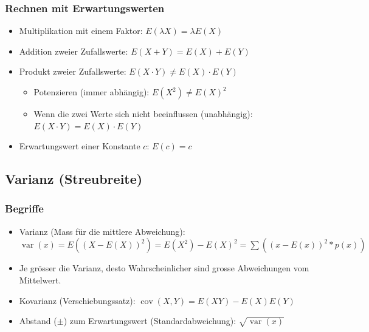 \subsubsection{Rechnen mit Erwartungswerten}
\begin{itemize}
  \item Multiplikation mit einem Faktor: $E(\lambda X) = \lambda E(X)$
  \item Addition zweier Zufallswerte: $E(X + Y) = E(X) + E(Y)$
  \item Produkt zweier Zufallswerte: $E(X \cdot Y) \ne E(X) \cdot E(Y)$
  \begin{itemize}
    \item Potenzieren (immer abhängig): $E(X^2) \ne E(X)^2$
    \item Wenn die zwei Werte sich nicht beeinflussen
      (unabhängig): $E(X \cdot Y) = E(X) \cdot E(Y)$
  \end{itemize}
  \item Erwartungswert einer Konstante $c$: $E(c) = c$
\end{itemize}

\subsection{Varianz (Streubreite)}
\subsubsection{Begriffe}
\begin{itemize}
  \item Varianz (Mass für die mittlere Abweichung):
    $\operatorname{var}(x) = E((X - E(X))^2) = E(X^2) - E(X)^2 = \sum((x-E(x))^2*p(x))$
  \item Je grösser die Varianz, desto Wahrscheinlicher sind grosse
    Abweichungen vom Mittelwert.
  \item Kovarianz (Verschiebungssatz):
    $\operatorname{cov}(X,Y) = E(XY) - E(X)E(Y)$
  \item Abstand ($\pm$) zum Erwartungswert (Standardabweichung):
  $\sqrt{\operatorname{var}(x)}$
\end{itemize}
